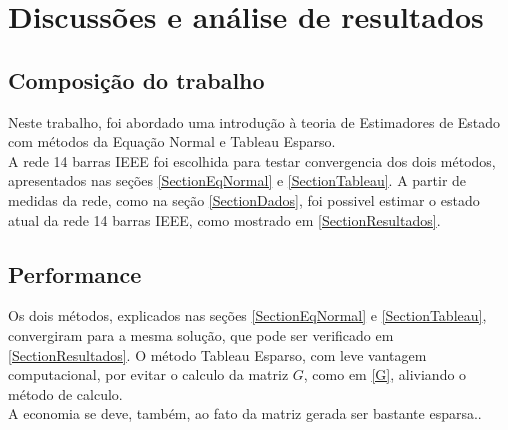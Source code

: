 \chapter{Discussões e an\'alise de resultados}
\section{Composição do trabalho}
Neste trabalho, foi abordado uma introdução à teoria de Estimadores de Estado com métodos da Equação Normal e Tableau Esparso.\\
A rede 14 barras IEEE foi escolhida para testar convergencia dos dois métodos, apresentados nas seções \ref{SectionEqNormal} e \ref{SectionTableau}. A partir de medidas da rede, como na seção \ref{SectionDados}, foi possivel estimar o estado atual da rede 14 barras IEEE, como mostrado em \ref{SectionResultados}.\\


\section{Performance}
Os dois métodos, explicados nas seções \ref{SectionEqNormal} e \ref{SectionTableau}, convergiram para a mesma solução, que pode ser verificado em \ref{SectionResultados}. O método Tableau Esparso, com leve vantagem computacional, por evitar o calculo da matriz $G$, como em \ref{G}, aliviando o método de calculo.\\
A economia se deve, também, ao fato da matriz gerada ser bastante esparsa.\cite{Mohamad}.
